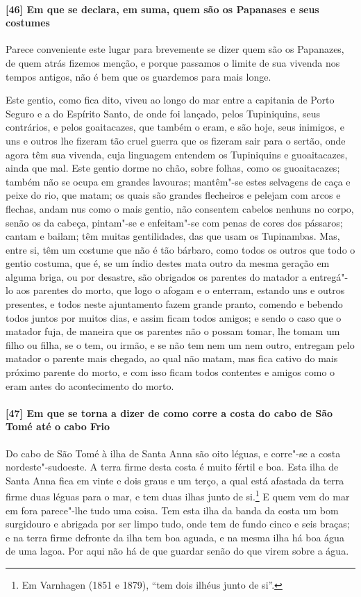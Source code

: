\begin{linenumbers}
\paragraph{[46] Em que se declara, em suma, quem são os Papanases e seus costumes} \quad
Parece conveniente este lugar para brevemente se dizer quem são os Papanazes, de quem
atrás fizemos menção, e porque passamos o limite de sua vivenda nos tempos antigos, não é
bem que os guardemos para mais longe.

Este gentio, como fica dito, viveu ao longo do mar entre a capitania de Porto Seguro e a
do Espírito Santo, de onde foi lançado, pelos Tupiniquins, seus contrários, e pelos
goaitacazes, que também o eram, e são hoje, seus inimigos, e uns e outros lhe fizeram tão
cruel guerra que os fizeram sair para o sertão, onde agora têm sua vivenda, cuja linguagem
entendem os Tupiniquins e guoaitacazes, ainda que mal. Este gentio dorme no chão, sobre
folhas, como os guoaitacazes; também não se ocupa em grandes lavouras; mantêm"-se estes
selvagens de caça e peixe do rio, que matam; os quais são grandes flecheiros e pelejam com
arcos e flechas, andam nus como o mais gentio, não consentem cabelos nenhuns no corpo,
senão os da cabeça, pintam"-se e enfeitam"-se com penas de cores dos pássaros; cantam e
bailam; têm muitas gentilidades, das que usam os Tupinambas. Mas, entre si, têm um costume
que não é tão bárbaro, como todos os outros que todo o gentio costuma, que é, se um índio
destes mata outro da mesma geração em alguma briga, ou por desastre, são obrigados os
parentes do matador a entregá"-lo aos parentes do morto, que logo o afogam e o enterram,
estando uns e outros presentes, e todos neste ajuntamento fazem grande pranto, comendo e
bebendo todos juntos por muitos dias, e assim ficam todos amigos; e sendo o caso que o
matador fuja, de maneira que os parentes não o possam tomar, lhe tomam um filho ou filha,
se o tem, ou irmão, e se não tem nem um nem outro, entregam pelo matador o parente mais
chegado, ao qual não matam, mas fica cativo do mais próximo parente do morto, e com isso
ficam todos contentes e amigos como o eram antes do acontecimento do morto.

\paragraph{[47] Em que se torna a dizer de como corre a costa do cabo de São Tomé até o cabo
Frio} \quad
Do cabo de São Tomé à ilha de Santa Anna são oito léguas, e corre"-se a costa
nordeste"-sudoeste. A terra firme desta costa é muito fértil e boa. Esta ilha de Santa Anna
fica em vinte e dois graus e um terço, a qual está afastada da terra firme duas léguas
para o mar, e tem duas ilhas junto de si.\footnote{ Em Varnhagen (1851 e 1879), ``tem dois
ilhéus junto de si''.} E quem vem do mar em fora parece"-lhe tudo uma coisa. Tem esta ilha
da banda da costa um bom surgidouro e abrigada por ser limpo tudo, onde tem de fundo cinco
e seis braças; e na terra firme defronte da ilha tem boa aguada, e na mesma ilha há boa
água de uma lagoa. Por aqui não há de que guardar senão do que virem sobre a água.


\end{linenumbers}
